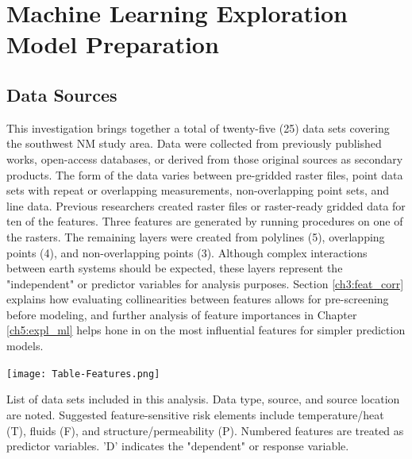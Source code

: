 \chapter{Machine Learning Exploration Model Preparation}\label{ch3:expl_prep}

\section{Data Sources}\label{ch3:expl_data_src}

This investigation brings together a total of twenty-five (25) data sets covering the southwest NM study area. Data were collected from previously published works, open-access databases, or derived from those original sources as secondary products. The form of the data varies between pre-gridded raster files, point data sets with repeat or overlapping measurements, non-overlapping point sets, and line data. Previous researchers created raster files or raster-ready gridded data for ten of the features. Three features are generated by running procedures on one of the rasters. The remaining layers were created from polylines (5), overlapping points (4), and non-overlapping points (3). Although complex interactions between earth systems should be expected, these layers represent the "independent" or predictor variables for analysis purposes. Section \ref{ch3:feat_corr} explains how evaluating collinearities between features allows for pre-screening before modeling, and further analysis of feature importances in Chapter \ref{ch5:expl_ml} helps hone in on the most influential features for simpler prediction models.

\begin{table}[htp]
\centering
\texttt{[image: Table-Features.png]}
\caption[Southwestern New Mexico features list]{List of data sets included in this analysis. Data type, source, and source location are noted. Suggested feature-sensitive risk elements include temperature/heat (T), fluids (F), and structure/permeability (P). Numbered features are treated as predictor variables. 'D' indicates the "dependent" or response variable.}
\label{tab:features}
\end{table}

